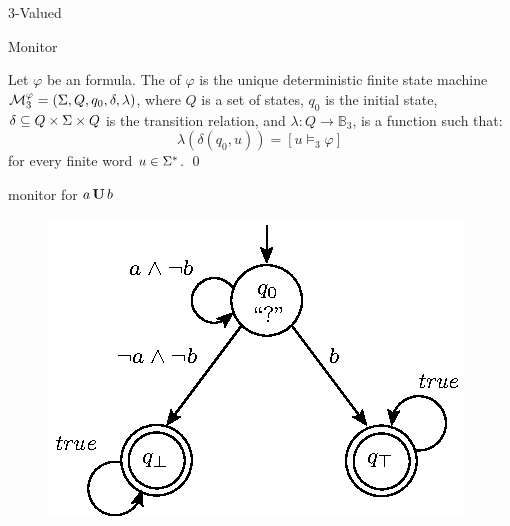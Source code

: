 




\begin{frame}{3-Valued \LTL}

\begin{block}{\LTLtri Monitor}
 
Let $\varphi$ be an \LTL formula. The  of $\varphi$ 
is the unique deterministic finite state machine $\mathcal{M}^{\varphi}_3 = 
(\Sigma, Q, q_0, \delta, \lambda)$, where $Q$ is a set of states, $q_0$ is 
the initial state, $\delta \subseteq Q \times \Sigma \times Q$ is the 
transition relation, and $\lambda: Q \rightarrow \mathbb{B}_3$, is a function 
such that:
\begin{equation*}
\lambda(\delta(q_0, u)) = \left[u \models_3 \varphi\right]
 \end{equation*} 
for every finite word $u \in \Sigma^*$. \qed

\end{block}


\begin{example}{\LTLtri monitor for $a \, \mathbf{U} \, b$}

\vspace{-7mm}
 \begin{figure}
 \centering
 \includegraphics[scale=.85]{figures/exprop}
 \end{figure}

\end{example}

\end{frame}









